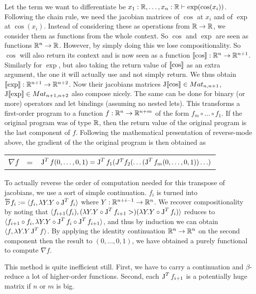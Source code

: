Let the term we want to differentiate be $x_1:\mathbb{R},\ldots,x_n:\mathbb{R}\vdash \exp(\cos(x_i))$.
Following the chain rule, we need the jacobian matrices of $\cos$ at $x_i$ and of $\exp$ at $\cos(x_i)$. 
Instead of considering these as operations from $\mathbb{R}\to\mathbb{R}$, we consider them as functions from the whole context. So $\cos$ and $\exp$ are seen as functions $\mathbb{R}^n\to\mathbb{R}$.
However, by simply doing this we lose compositionality. 
So $\cos$ will also return its context and is now seen as a function $\llbracket \cos\rrbracket:\mathbb{R}^n\to\mathbb{R}^{n+1}$.
Similarly for $\exp$, but also taking the return value of $\llbracket \cos\rrbracket$ as an extra argument, the one it will actually use and not simply return. 
We thus obtain $\llbracket \exp\rrbracket:\mathbb{R}^{n+1}\to\mathbb{R}^{n+2}$. Now their jacobians matrices $\operatorname{J}\llbracket \cos\rrbracket \in Mat_{n,n+1}$, $\operatorname{J}\llbracket \exp\rrbracket \in Mat_{n+1,n+2}$ also compose nicely.
The same can be done for binary (or more) operators and let bindings (assuming no nested lets). 
This transforms a first-order program to a function $f:\mathbb{R}^n\to\mathbb{R}^{n+m}$ of the form $f_m\circ\ldots\circ f_1$. 
If the original program was of type $\mathbb{R}$, then the return value of the original program is the last component of $f$.
Following the mathematical presentation of reverse-mode above, the gradient of the the original program is then obtained as 
\begin{center}
    \begin{tabular}{r c l}
        $\nabla f$ &=& $\operatorname{J}^Tf(0,\ldots,0,1)= \operatorname{J}^Tf_1(J^Tf_{2}(\ldots(\operatorname{J}^Tf_m(0,\ldots,0,1))\ldots)$
    \end{tabular}
\end{center}

To actually reverse the order of computation needed for this transpose of jacobians, we use a sort of simple continuation.
$f_i$ is turned into $\Dsynrevsymbol{f_i}:= \langle f_i, \lambda Y. Y\circ \J^Tf_i \rangle$ where $Y:\mathbb{R}^{n+i-1}\to \mathbb{R}^n$. 
We recover compositionality by noting that $\langle f_{i+1}(f_i), (\lambda Y. Y\circ \operatorname{J}^Tf_{i+1}>)(\lambda Y. Y\circ \operatorname{J}^Tf_i)\rangle$ reduces to
$\langle f_{i+1}\circ f_i, \lambda Y. Y\circ \operatorname{J}^Tf_i \circ \operatorname{J}^Tf_{i+1} \rangle$, and thus by induction we can obtain $\langle f, \lambda Y. Y\operatorname{J}^Tf \rangle$.
By applying the identity continuation $\mathbb{R}^n\to\mathbb{R}^n$ on the second component then the result to $(0,\ldots,0,1)$, 
we have obtained a purely functional to compute $\nabla f$. 

This method is quite inefficient still. First, we have to carry a continuation and $\beta$-reduce a lot of higher-order functions.
Second, each $\operatorname{J}^Tf_{i+1}$ is a potentially huge matrix if $n$ or $m$ is big.

